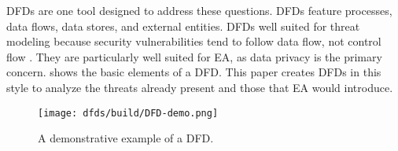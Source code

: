 \Acp{DFD} are one tool designed to address these questions. \Acp{DFD} feature processes, data flows, data stores, and
external entities. \Acp{DFD} well suited for threat modeling because security vulnerabilities tend to follow data flow,
not control flow \cite{shostack_threat_2014}. They are particularly well suited for \ac{EA}, as data privacy is the
primary concern.  shows the basic elements of a \ac{DFD}. This paper creates \acp{DFD} in this style
to analyze the threats already present and those that \ac{EA} would introduce.

\begin{figure}[ht]
    \centering\CaptionFontSize
    \texttt{[image: dfds/build/DFD-demo.png]}
    \caption[\Acs{DFD} Demo]{A demonstrative example of a \acf{DFD}.}
    \label{fig-dfd-demo}
\end{figure}
